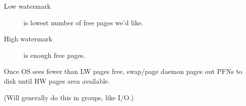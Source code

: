\begin{description}
\item[Low watermark] is lowest number of free pages we'd like.
\item[High watermark] is enough free pages.
\end{description}

Once OS sees fewer than LW pages free, swap/page daemon pages out PFNs to disk until HW pages area available.

(Will generally do this in groups, like I/O.)





